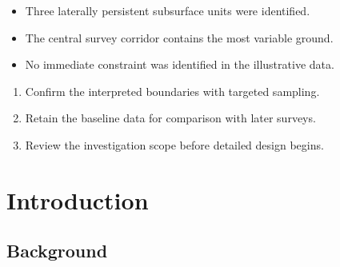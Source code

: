 \documentclass{erp-report}
\begin{document}
\makecover

\reportfrontmatter
\makedocumentcontrol

\begin{executivesummary}

  \lipsum[1]

  \begin{keyfindings}
    \begin{itemize}
      \item Three laterally persistent subsurface units were identified.
      \item The central survey corridor contains the most variable ground.
      \item No immediate constraint was identified in the illustrative data.
    \end{itemize}
  \end{keyfindings}

  \begin{recommendations}
    \begin{enumerate}
      \item Confirm the interpreted boundaries with targeted sampling.
      \item Retain the baseline data for comparison with later surveys.
      \item Review the investigation scope before detailed design begins.
    \end{enumerate}
  \end{recommendations}
\end{executivesummary}

\tableofcontents
\listoffigures
\listoftables

\reportmainmatter

\chapter{Introduction}

\section{Background}
\lipsum[2-3]
\end{document}
